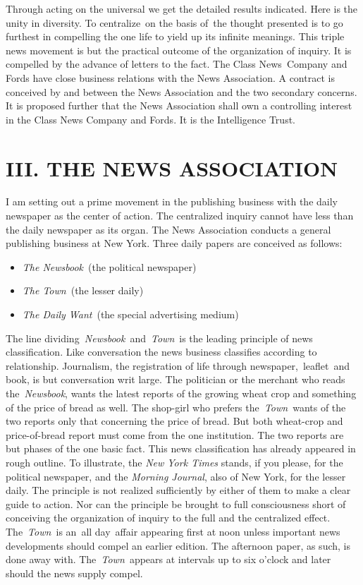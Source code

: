 \documentclass[openany,nobib]{tufte-book}
\begin{document}
Through acting on the universal we get the detailed results indicated.
Here is the unity in diversity. To centralize~on the basis of~the
thought presented is to go furthest in compelling the one life to yield
up its infinite meanings. This triple news movement is but the practical
outcome of the organization of inquiry. It is compelled by the advance
of letters to the fact. The Class News~Company and Fords have close
business relations with the News Association. A contract is conceived by
and between the News Association and the two secondary concerns. It is
proposed further that the News Association shall own a controlling
interest in the Class News Company and Fords. It is the Intelligence
Trust.~

\hypertarget{iii-the-news-association}{%
\section{III. THE NEWS ASSOCIATION}\label{iii-the-news-association}}

I am setting out a prime movement in the publishing business with the
daily newspaper as the center of action. The centralized inquiry cannot
have less than the daily newspaper as its organ. The News Association
conducts a general publishing business at New York. Three daily papers
are conceived as follows:~

\begin{itemize}
\item
  \emph{The Newsbook}~(the political newspaper)~
\item
  \emph{The Town}~(the lesser daily)~
\item
  \emph{The Daily Want}~(the special advertising medium)~
\end{itemize}

The line dividing\emph{~Newsbook}~and~\emph{Town}~is the leading
principle of news classification. Like conversation the news business
classifies according to relationship. Journalism, the registration of
life through newspaper,~leaflet~and book, is but conversation writ
large. The politician or the merchant who reads the~\emph{Newsbook},
wants the latest reports of the growing wheat crop and something of the
price of bread as well. The shop-girl who prefers the\emph{~Town}~wants
of the two reports only that concerning the price of bread. But both
wheat-crop and price-of-bread report must come from the one institution.
The two reports are but phases of the one basic fact. This news
classification has already appeared in rough outline. To illustrate, the
\emph{New York Times} stands, if you please, for the political
newspaper, and the \emph{Morning Journal}, also of New York, for the
lesser daily. The principle is not realized sufficiently by either of
them to make a clear guide to action. Nor can the principle be brought
to full consciousness short of conceiving the organization of inquiry to
the full and the centralized effect. The~\emph{Town~}is an~all
day~affair appearing first at noon unless important news developments
should compel an earlier edition. The afternoon paper, as such, is done
away with. The\emph{~Town~}appears at intervals up to six o'clock and
later should the news supply compel.~
\end{document}
